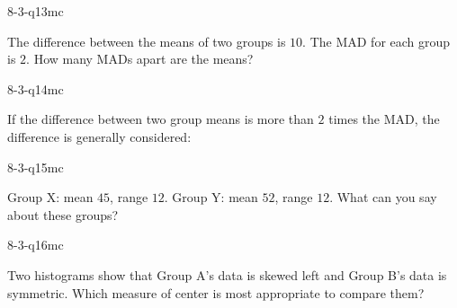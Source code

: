 \begin{practiceQuestion}{8-3-q13}{mc}
\begin{questionText}
The difference between the means of two groups is $10$. The MAD for each group is $2$. How many MADs apart are the means?
\end{questionText}
\end{practiceQuestion}

\begin{practiceQuestion}{8-3-q14}{mc}
\begin{questionText}
If the difference between two group means is more than $2$ times the MAD, the difference is generally considered:
\end{questionText}
\end{practiceQuestion}

\begin{practiceQuestion}{8-3-q15}{mc}
\begin{questionText}
Group X: mean $45$, range $12$. Group Y: mean $52$, range $12$. What can you say about these groups?
\end{questionText}
\end{practiceQuestion}

\begin{practiceQuestion}{8-3-q16}{mc}
\begin{questionText}
Two histograms show that Group A's data is skewed left and Group B's data is symmetric. Which measure of center is most appropriate to compare them?
\end{questionText}
\end{practiceQuestion}

